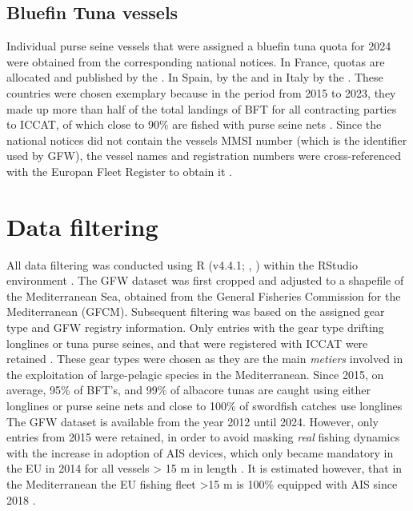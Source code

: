 \subsection{Bluefin Tuna vessels}
Individual purse seine vessels that were assigned a bluefin tuna quota for 2024 were obtained from the corresponding national notices. In France,
quotas are allocated and published by the \cite{registry_france}. In Spain,
by the \cite{registry_spain} and in Italy by the \cite{registry_italy}. These countries were chosen exemplary because in the period from 2015 to 2023,
they made up more than half of the total landings of BFT for all contracting parties to ICCAT, of which close to 90\% are fished with purse seine nets \citep{iccat_bft_summary}.
Since the national notices did not contain the vessels MMSI number (which is the identifier used by GFW), the vessel names and registration numbers were
cross-referenced with the Europan Fleet Register to obtain it \citep{eu_fleet_register}. 


\section{Data filtering}
All data filtering was conducted using R (v4.4.1; \citeauthor{r_language}, \citeyear{r_language}) within the RStudio environment \citep{rstudio}.
The GFW dataset was first cropped and adjusted to a shapefile of the Mediterranean Sea, obtained from the General Fisheries
Commission for the Mediterranean (GFCM). Subsequent filtering was based on the assigned gear type and GFW registry
information. Only entries with the gear type drifting longlines or tuna purse seines, and that were registered with
ICCAT were retained . These gear types were chosen as they are the main \textit{metiers} involved in the exploitation of large-pelagic species in the Mediterranean.
Since 2015, on average, 95\% of BFT's, and 99\% of albacore tunas are caught using either longlines or purse seine nets and close to 100\% of swordfish catches use longlines \citep{iccat_bft_summary,iccat_alb_summary,iccat_swo_summary}
The GFW dataset is available from the year 2012 until 2024. However, only entries from 2015 were retained, in order to avoid masking \textit{real} fishing dynamics with the increase in
adoption of AIS devices, which only became mandatory in the EU in 2014 for all vessels > 15 m in length \citep{ec2011directive}. It is estimated however, that in the Mediterranean the EU fishing fleet >15 m is 100\% equipped with AIS since 2018 \citep{taconet2019global}.

